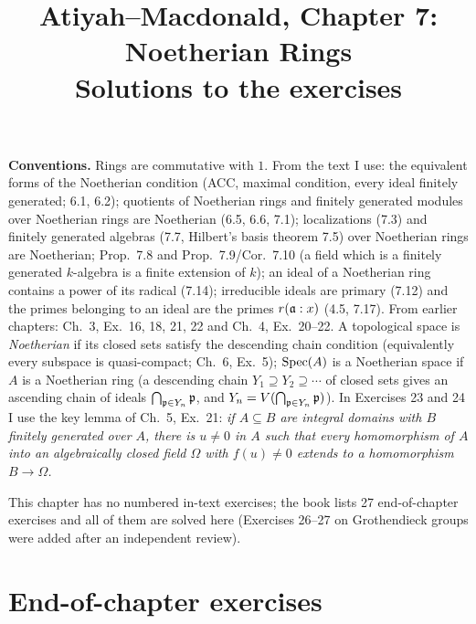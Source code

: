 \documentclass[11pt]{article}
\title{Atiyah--Macdonald, Chapter 7: Noetherian Rings\\[2pt]\large Solutions to the exercises}
\author{}
\date{}
\begin{document}
\maketitle
\noindent\textbf{Conventions.} Rings are commutative with $1$. From the text I use: the equivalent forms of the Noetherian condition (ACC, maximal condition, every ideal finitely generated; 6.1, 6.2); quotients of Noetherian rings and finitely generated modules over Noetherian rings are Noetherian (6.5, 6.6, 7.1); localizations (7.3) and finitely generated algebras (7.7, Hilbert's basis theorem 7.5) over Noetherian rings are Noetherian; Prop.~7.8 and Prop.~7.9/Cor.~7.10 (a field which is a finitely generated $k$-algebra is a finite extension of $k$); an ideal of a Noetherian ring contains a power of its radical (7.14); irreducible ideals are primary (7.12) and the primes belonging to an ideal are the primes $r(\mathfrak a:x)$ (4.5, 7.17). From earlier chapters: Ch.~3, Ex.~16, 18, 21, 22 and Ch.~4, Ex.~20--22. A topological space is \emph{Noetherian} if its closed sets satisfy the descending chain condition (equivalently every subspace is quasi-compact; Ch.~6, Ex.~5); $\operatorname{Spec}(A)$ is a Noetherian space if $A$ is a Noetherian ring (a descending chain $Y_1\supseteq Y_2\supseteq\cdots$ of closed sets gives an ascending chain of ideals $\bigcap_{\mathfrak p\in Y_n}\mathfrak p$, and $Y_n=V(\bigcap_{\mathfrak p\in Y_n}\mathfrak p)$). In Exercises 23 and 24 I use the key lemma of Ch.~5, Ex.~21: \emph{if $A\subseteq B$ are integral domains with $B$ finitely generated over $A$, there is $u\ne0$ in $A$ such that every homomorphism of $A$ into an algebraically closed field $\Omega$ with $f(u)\ne0$ extends to a homomorphism $B\to\Omega$.}

This chapter has no numbered in-text exercises; the book lists 27 end-of-chapter exercises and all of them are solved here (Exercises 26--27 on Grothendieck groups were added after an independent review).

\section*{End-of-chapter exercises}
\end{document}
